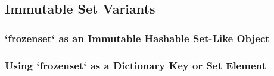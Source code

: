 \subsection{Immutable Set Variants}
\subsubsection{`frozenset` as an Immutable Hashable Set-Like Object}
\subsubsection{Using `frozenset` as a Dictionary Key or Set Element}
